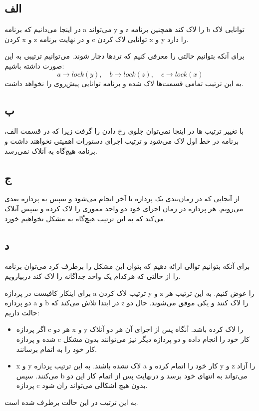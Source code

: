 \subsection*{الف}
در اینجا می‌دانیم که برنامه
a
می‌تواند
y
و
z
را لاک کند همچنین برنامه
b
توانایی لاک کردن
x
و
z
و در نهایت برنامه
c
توانایی لاک‌ کردن
x
و
y
را دارد.

برای آنکه بتوانیم حالتی را معرفی کنیم که تردها دچار
شوند. می‌توانیم ترتیبی به این صورت داشته باشیم:
\[
    a \to lock(y), \quad b \to lock(z), \quad c \to lock(x)
\]
به این ترتیب تمامی قسمت‌ها لاک شده و برنامه توانایی پیش‌روی را نخواهد داشت.

\subsection*{ب}
با تغییر ترتیب
ها در اینجا نمی‌توان جلوی رخ دادن
را گرفت زیرا که در قسمت الف، برنامه در خط اول لاک می‌شود و ترتیب اجرای دستورات
اهمیتی نخواهند داشت و برنامه هیچ‌گاه به آنلاک نمی‌رسد.

\subsection*{ج}
از آنجایی که در زمان‌بندی
یک پردازه تا آخر انجام می‌شود و سپس به پردازه بعدی می‌رویم. هر پردازه در زمان اجرای خود دو واحد مموری را لاک کرده و سپس آنلاک می‌کند که به این ترتیب هیچ‌گاه به مشکل
نخواهیم خورد.

\subsection*{د}
برای آنکه بتوانیم توالی ارائه دهیم که بتوان این مشکل را برطرف کرد می‌توان برنامه را از حالتی که هرکدام یک واحد جداگانه را لاک کند دربیارویم.

برای اینکار کافیست در پردازه
a
ترتیب لاک کردن
y
و
z 
را عوض کنیم. به این ترتیب هر دو پردازه
a
و
b
در ابتدا تلاش می‌کند که
z
را لاک کنند و یکی موفق می‌شوند. حال دو حالت داریم:
\begin{itemize}
    \item
    اگر پردازه
    c
    هر دو
    x
    و
    y
    را لاک کرده باشد. آنگاه پس از اجرای آن هر دو آنلاک شده و پردازه
    c
    کار خود را انجام داده و دو پردازه دیگر نیز می‌توانند بدون مشکل کار خود را به اتمام برسانند.
    
    \item
    x
    و
    y
    لاک نشده باشند. به این ترتیب پردازه
    a
    کار خود را اتمام کرده و 
    y
    و
    z
    را آزاد می‌کنند. سپس
    b
    می‌تواند به انتهای خود برسد و درنهایت پس از اتمام کار این دو پردازه
    c
    بدون هیچ اشکالی می‌تواند ران شود.
\end{itemize}
به این ترتیب
در این حالت برطرف شده است.
